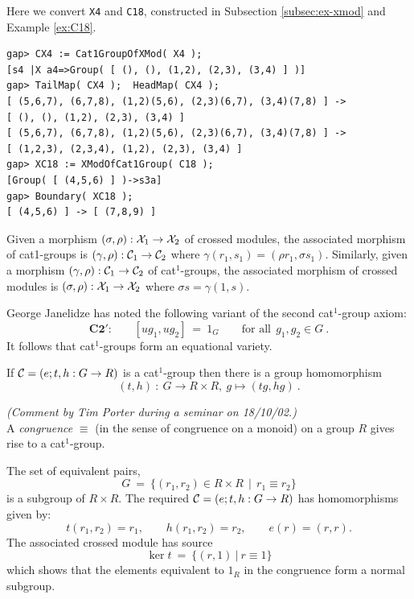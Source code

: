 \begin{example} 
Here we convert \verb+X4+ and \verb+C18+, 
constructed in Subsection \ref{subsec:ex-xmod} and Example \ref{ex:C18}. 
{\small 
\begin{verbatim}
gap> CX4 := Cat1GroupOfXMod( X4 );
[s4 |X a4=>Group( [ (), (), (1,2), (2,3), (3,4) ] )]
gap> TailMap( CX4 );  HeadMap( CX4 );
[ (5,6,7), (6,7,8), (1,2)(5,6), (2,3)(6,7), (3,4)(7,8) ] -> 
[ (), (), (1,2), (2,3), (3,4) ]
[ (5,6,7), (6,7,8), (1,2)(5,6), (2,3)(6,7), (3,4)(7,8) ] -> 
[ (1,2,3), (2,3,4), (1,2), (2,3), (3,4) ]
gap> XC18 := XModOfCat1Group( C18 );
[Group( [ (4,5,6) ] )->s3a]
gap> Boundary( XC18 );
[ (4,5,6) ] -> [ (7,8,9) ]
\end{verbatim}} 
\end{example} 

Given a morphism 
$(\sigma,\rho) : \mathcal{X}_1 \to \mathcal{X}_2$ of crossed modules,
the associated morphism of cat1-groups is
$(\gamma,\rho) : \mathcal{C}_1 \to \mathcal{C}_2$ where
$\gamma(r_1,s_1) = (\rho r_1, \sigma s_1)$.
Similarly, given a morphism 
$(\gamma,\rho) : \mathcal{C}_1 \to \mathcal{C}_2$ of cat$^1$-groups,
the associated morphism of crossed modules is
$(\sigma,\rho) : \mathcal{X}_1 \to \mathcal{X}_2$ where
$\sigma s = \gamma(1,s)$.


George Janelidze has noted the following variant of the second
cat$^1$-group axiom:
$$
\textbf{C2}'\textbf{:}  \qquad  
[ug_1,ug_2] ~=~ 1_G
\qquad \text{for all}~~ g_1,g_2 \in G~.
$$
It follows that cat$^1$-groups form an equational variety.

\begin{lem}
If  $\mathcal{C} = (e;t,h : G \to R )$  is a cat$^1$-group
then there is a group homomorphism
$$
(t,h) ~:~ G \to R \times R, ~ g \mapsto (tg,hg)~.
$$
\end{lem}


\begin{prop}
\emph{(Comment by Tim Porter during a seminar on 18/10/02.)\\}
A \emph{congruence}  $\equiv$ 
(in the sense of congruence on a monoid) 
on a group $R$ gives rise to a cat$^1$-group.
\end{prop}
\begin{pf}
The set of equivalent pairs,
$$
G ~=~ \{(r_1,r_2) \in R \times R ~~|~~ r_1 \equiv r_2 \}
$$
is a subgroup of  $R \times R$.
The required  $\mathcal{C} = (e;t,h : G \to R )$  has homomorphisms given by:
$$
t(r_1,r_2) = r_1, \qquad
h(r_1,r_2) = r_2, \qquad
e(r) = (r,r).
$$
The associated crossed module has source
$$
\ker t ~=~ \{(r,1) ~|~ r \equiv 1 \}
$$
which shows that the elements equivalent to $1_R$ in the congruence
form a normal subgroup.
\end{pf}



